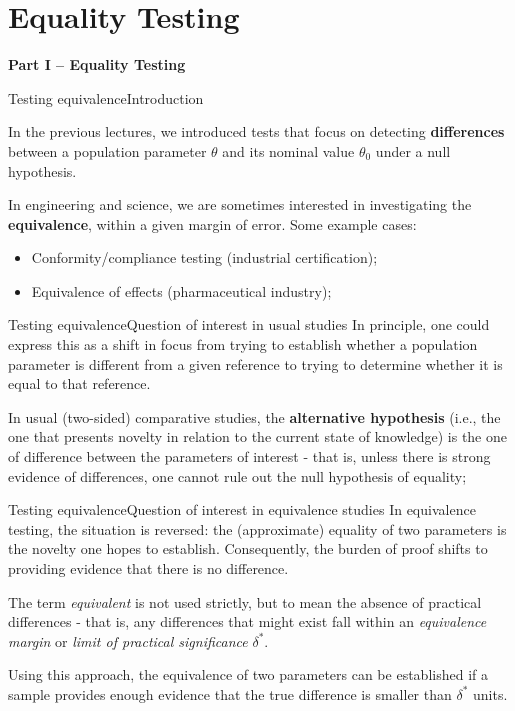 \section{Equality Testing}

\begin{frame}

  \begin{center}
    {\bf Part I -- Equality Testing}
  \end{center}

\end{frame}

\begin{frame}{Testing equivalence}{Introduction}

In the previous lectures, we introduced tests that focus on detecting {\bf differences} between a population parameter $\theta$ and its nominal value $\theta_0$ under a null hypothesis.\bigskip

In engineering and science, we are sometimes interested in investigating the {\bf equivalence}, within a given margin of error. Some example cases:\bigskip

\begin{itemize}
  \item Conformity/compliance testing (industrial certification);
  \item Equivalence of effects (pharmaceutical industry);
\end{itemize}
\end{frame}

\begin{frame}{Testing equivalence}{Question of interest in usual studies}
In principle, one could express this as a shift in focus from trying to establish whether a population parameter is different from a given reference to trying to determine whether it is equal to that reference.
\vfill

In usual (two-sided) comparative studies, the {\bf alternative hypothesis} (i.e., the one that presents novelty in relation to the current state of knowledge) is the one of difference between the parameters of interest - that is, unless there is strong evidence of differences, one cannot rule out the null hypothesis of equality;
\end{frame}

\begin{frame}{Testing equivalence}{Question of interest in equivalence studies}
In equivalence testing, the situation is reversed: the (approximate) equality of two parameters is the novelty one hopes to establish. Consequently, the burden of proof shifts to providing evidence that there is no difference.
\bigskip

The term \textit{equivalent} is not used strictly, but to mean the absence of practical differences - that is, any differences that might exist fall within an \textit{equivalence margin} or \textit{limit of practical significance} $\delta^*$.
\bigskip

Using this approach, the equivalence of two parameters can be established if a sample provides enough evidence that the true difference is smaller than $\delta^*$ units.
\end{frame}

